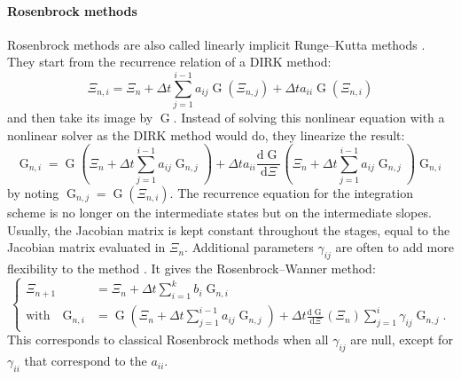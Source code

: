         \paragraph{Rosenbrock methods}
        Rosenbrock methods are also called linearly implicit Runge--Kutta methods \cite{Rosenbrock1963}.
        They start from the recurrence relation of a DIRK method:
        \begin{equation}
          \Xi_{n,i} = \Xi_n + \Delta t \sum_{j = 1}^{i-1} a_{ij} \operatorname{G}\left(\Xi_{n,j}\right) + \Delta t a_{ii} \operatorname{G}\left(\Xi_{n,i}\right)
        \end{equation}
        and then take its image by $\operatorname{G}$.
        Instead of solving this nonlinear equation with a nonlinear solver as the DIRK method would do, they linearize the result:
        \begin{equation}
          \operatorname{G}_{n,i} = \operatorname{G}\left(\Xi_n + \Delta t \sum_{j = 1}^{i-1} a_{ij} \operatorname{G}_{n,j}\right)
          + \Delta t a_{ii} \frac{\mathrm{d} \operatorname{G}}{\mathrm{d} \Xi}\left(\Xi_n + \Delta t \sum_{j = 1}^{i-1} a_{ij} \operatorname{G}_{n,j}\right) \operatorname{G}_{n,i}
        \end{equation}
        by noting $\operatorname{G}_{n,j} = \operatorname{G}\left(\Xi_{n,i}\right)$.
        The recurrence equation for the integration scheme is no longer on the intermediate states but on the intermediate slopes.
        Usually, the Jacobian matrix is kept constant throughout the stages, equal to the Jacobian matrix evaluated in $\Xi_n$.
        Additional parameters $\gamma_{ij}$ are often to add more flexibility to the method \cite{Wanner1977}.
        It gives the Rosenbrock--Wanner method:
        \begin{equation}
          \left\{\begin{aligned}
            \Xi_{n+1} &= \Xi_n + \Delta t \sum_{i = 1}^k b_i \operatorname{G}_{n,i} \\
            \textrm{with}\quad \operatorname{G}_{n,i} &=
              \operatorname{G}\left(\Xi_n + \Delta t \sum_{j = 1}^{i-1} a_{ij} \operatorname{G}_{n,j}\right)
              + \Delta t \frac{\mathrm{d} \operatorname{G}}{\mathrm{d} \Xi}\left(\Xi_n\right) \sum_{j = 1}^{i} \gamma_{ij} \operatorname{G}_{n,j}.
          \end{aligned}\right.
        \end{equation}
        This corresponds to classical Rosenbrock methods when all $\gamma_{ij}$ are null, except for $\gamma_{ii}$ that correspond to the $a_{ii}$.
